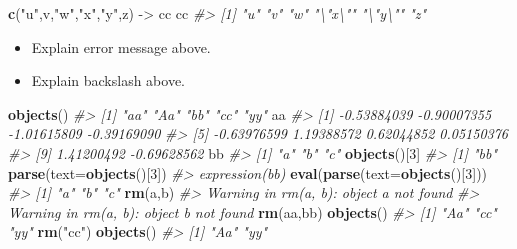 \documentclass[
]{book}
\newenvironment{Shaded}{\begin{snugshade}}{\end{snugshade}}
\newcommand{\AttributeTok}[1]{\textcolor[rgb]{0.13,0.29,0.53}{#1}}
\newcommand{\CommentTok}[1]{\textcolor[rgb]{0.56,0.35,0.01}{\textit{#1}}}
\newcommand{\DecValTok}[1]{\textcolor[rgb]{0.00,0.00,0.81}{#1}}
\newcommand{\FunctionTok}[1]{\textcolor[rgb]{0.13,0.29,0.53}{\textbf{#1}}}
\newcommand{\NormalTok}[1]{#1}
\newcommand{\OtherTok}[1]{\textcolor[rgb]{0.56,0.35,0.01}{#1}}
\newcommand{\StringTok}[1]{\textcolor[rgb]{0.31,0.60,0.02}{#1}}
\providecommand{\tightlist}{%
  \setlength{\itemsep}{0pt}\setlength{\parskip}{0pt}}
\begin{document}
\begin{Shaded}
\begin{Highlighting}[]
\FunctionTok{c}\NormalTok{(}\StringTok{"u"}\NormalTok{,}\StringTok{\textquotesingle{}v\textquotesingle{}}\NormalTok{,}\StringTok{"\textquotesingle{}w\textquotesingle{}"}\NormalTok{,}\StringTok{\textquotesingle{}"x"\textquotesingle{}}\NormalTok{,}\StringTok{\textquotesingle{}"y"\textquotesingle{}}\NormalTok{,}\StringTok{\textquotesingle{}z\textquotesingle{}}\NormalTok{) }\OtherTok{{-}\textgreater{}}\NormalTok{ cc }
\NormalTok{cc}
\CommentTok{\#\textgreater{} [1] "u"     "v"     "\textquotesingle{}w\textquotesingle{}"   "\textbackslash{}"x\textbackslash{}"" "\textbackslash{}"y\textbackslash{}"" "z"}
\end{Highlighting}
\end{Shaded}

\begin{itemize}
\tightlist
\item
  Explain error message above.
\item
  Explain backslash above.
\end{itemize}

\begin{Shaded}
\begin{Highlighting}[]
\FunctionTok{objects}\NormalTok{()}
\CommentTok{\#\textgreater{} [1] "aa" "Aa" "bb" "cc" "yy"}
\NormalTok{aa}
\CommentTok{\#\textgreater{}  [1] {-}0.53884039 {-}0.90007355 {-}1.01615809 {-}0.39169090}
\CommentTok{\#\textgreater{}  [5] {-}0.63976599  1.19388572  0.62044852  0.05150376}
\CommentTok{\#\textgreater{}  [9]  1.41200492 {-}0.69628562}
\NormalTok{bb}
\CommentTok{\#\textgreater{} [1] "a" "b" "c"}
\FunctionTok{objects}\NormalTok{()[}\DecValTok{3}\NormalTok{]}
\CommentTok{\#\textgreater{} [1] "bb"}
\FunctionTok{parse}\NormalTok{(}\AttributeTok{text=}\FunctionTok{objects}\NormalTok{()[}\DecValTok{3}\NormalTok{])}
\CommentTok{\#\textgreater{} expression(bb)}
\FunctionTok{eval}\NormalTok{(}\FunctionTok{parse}\NormalTok{(}\AttributeTok{text=}\FunctionTok{objects}\NormalTok{()[}\DecValTok{3}\NormalTok{]))}
\CommentTok{\#\textgreater{} [1] "a" "b" "c"}
\FunctionTok{rm}\NormalTok{(a,b)}
\CommentTok{\#\textgreater{} Warning in rm(a, b): object \textquotesingle{}a\textquotesingle{} not found}
\CommentTok{\#\textgreater{} Warning in rm(a, b): object \textquotesingle{}b\textquotesingle{} not found}
\FunctionTok{rm}\NormalTok{(aa,bb)}
\FunctionTok{objects}\NormalTok{()}
\CommentTok{\#\textgreater{} [1] "Aa" "cc" "yy"}
\FunctionTok{rm}\NormalTok{(}\StringTok{"cc"}\NormalTok{)}
\FunctionTok{objects}\NormalTok{()}
\CommentTok{\#\textgreater{} [1] "Aa" "yy"}
\end{Highlighting}
\end{Shaded}
\end{document}
